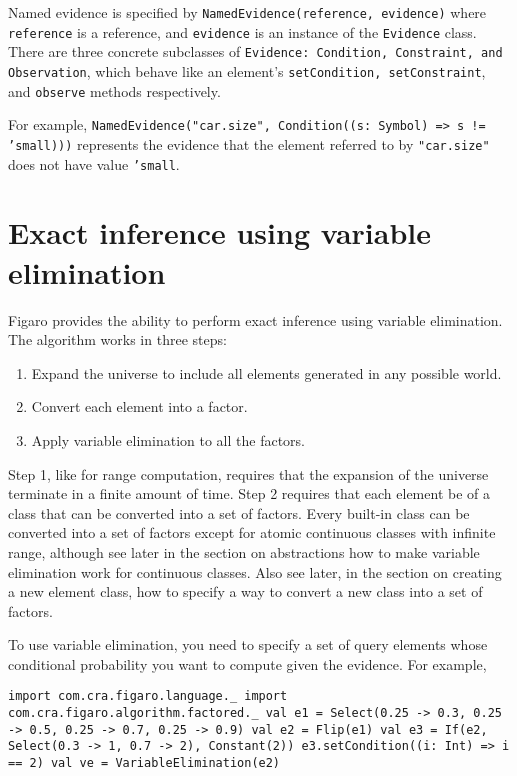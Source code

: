 Named evidence is specified by
\newline \texttt{NamedEvidence(reference, evidence)}
\newline where \texttt{reference} is a reference, and \texttt{evidence} is an instance of the \texttt{Evidence} class. There are three concrete subclasses of \texttt{Evidence: Condit\-ion, Constraint, and Observation}, which behave like an element's \texttt{setCond\-ition, setConstraint}, and \texttt{observe} methods respectively.

For example,
\newline \texttt{NamedEvidence("car.size", Condition((s: Symbol) => s != 'small\-)))}
\newline represents the evidence that the element referred to by \texttt{"car.size"} does not have value  \texttt{'small}.

\section{Exact inference using variable elimination}

Figaro provides the ability to perform exact inference using variable elimination. The algorithm works in three steps:
\begin{enumerate}
\item Expand the universe to include all elements generated in any possible world.
\item Convert each element into a factor.
\item  Apply variable elimination to all the factors.
\end{enumerate}

Step 1, like for range computation, requires that the expansion of the universe terminate in a finite amount of time. Step 2 requires that each element be of a class that can be converted into a set of factors. Every built-in class can be converted into a set of factors except for atomic continuous classes with infinite range, although see later in the section on abstractions how to make variable elimination work for continuous classes. Also see later, in the section on creating a new element class, how to specify a way to convert a new class into a set of factors.

To use variable elimination, you need to specify a set of query elements whose conditional probability you want to compute given the evidence. For example,

\begin{flushleft}
\texttt{import com.cra.figaro.language.\_
\newline import com.cra.figaro.algorithm.factored.\_
\newline 
\newline val e1 = Select(0.25 -> 0.3, 0.25 -> 0.5, 0.25 -> 0.7, 0.25 -> 0.9)
\newline val e2 = Flip(e1)
\newline val e3 = If(e2, Select(0.3 -> 1, 0.7 -> 2), Constant(2))
\newline e3.setCondition((i: Int) => i == 2)
\newline 
\newline val ve = VariableElimination(e2)}
\end{flushleft}

